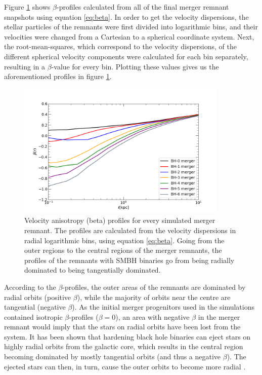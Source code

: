 \documentclass[english, oneside]{HYgradu}
\begin{document}
Figure \ref{figure:beta_no_rb} shows $\beta$-profiles calculated from all of the final merger remnant snapshots using equation \ref{eq:beta}. In order to get the velocity dispersions, the stellar particles of the remnants were first divided into logarithmic bins, and their velocities were changed from a Cartesian to a spherical coordinate system. Next, the root-mean-squares, which correspond to the velocity dispersions, of the different spherical velocity components were calculated for each bin separately, resulting in a $\beta$-value for every bin. Plotting these values gives us the aforementioned profiles in figure \ref{figure:beta_no_rb}. 

\begin{figure}[h]
	\centering
	\includegraphics[width=0.9\textwidth]{beta_no_rb.png}
	\caption{Velocity anisotropy (beta) profiles for every simulated merger remnant. The profiles are calculated from the velocity dispersions in radial logarithmic bins, using equation \ref{eq:beta}. Going from the outer regions to the central regions of the merger remnants, the profiles of the remnants with SMBH binaries go from being radially dominated to being tangentially dominated.}
	\label{figure:beta_no_rb}
\end{figure}

According to the $\beta$-profiles, the outer areas of the remnants are dominated by radial orbits (positive $\beta$), while the majority of orbits near the centre are tangential (negative $\beta$). As the initial merger progenitors used in the simulations contained isotropic $\beta$-profiles ($\beta = 0$), an area with negative $\beta$ in the merger remnant would imply that the stars on radial orbits have been lost from the system. It has been shown that hardening black hole binaries can eject stars on highly radial orbits from the galactic core, which results in the central region becoming dominated by mostly tangential orbits (and thus a negative $\beta$). The ejected stars can then, in turn, cause the outer orbits to become more radial \citep{Quinlan1997, Milosavljevic2001, Thomas2014}. 
\end{document}

